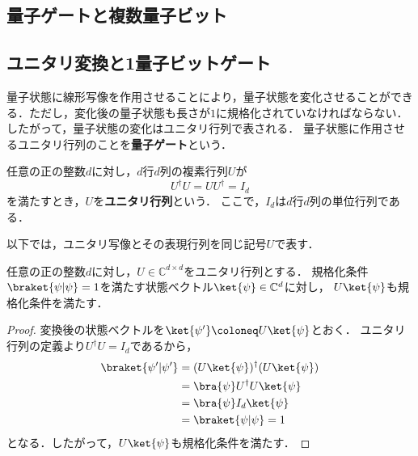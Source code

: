 \begin{samepage}
\section{量子ゲートと複数量子ビット}
\label{sec:gates-composite}

\subsection{ユニタリ変換と1量子ビットゲート}

量子状態に線形写像を作用させることにより，量子状態を変化させることができる．ただし，変化後の量子状態も長さが$1$に規格化されていなければならない．したがって，量子状態の変化はユニタリ行列で表される．
量子状態に作用させるユニタリ行列のことを\textbf{量子ゲート}という．

\begin{defi}[ユニタリ行列]
任意の正の整数$d$に対し，$d$行$d$列の複素行列$U$が
\label{def:unitary-matrix-map}
\begin{equation*}
  U^\dagger U=UU^\dagger=I_d
\end{equation*}
を満たすとき，$U$を\textbf{ユニタリ行列}という．
ここで，$I_d$は$d$行$d$列の単位行列である．
\end{defi}
\end{samepage}

以下では，ユニタリ写像とその表現行列を同じ記号$U$で表す．

\begin{prop}[ユニタリ行列による規格化条件の保存]
  任意の正の整数$d$に対し，$U\in\mathbb C^{d\times d}$をユニタリ行列とする．
  規格化条件$\braket{\psi|\psi}=1$を満たす状態ベクトル$\ket{\psi}\in\mathbb C^d$に対し，
  $U\ket{\psi}$も規格化条件を満たす．
  \label{prop:unitary-preserves-normalization}
\end{prop}
\begin{proof}
  変換後の状態ベクトルを$\ket{\psi'}\coloneq U\ket{\psi}$とおく．
  ユニタリ行列の定義より$U^\dagger U=I_d$であるから，
  \begin{equation*}
    \begin{aligned}
      \braket{\psi'|\psi'}
      &=(U\ket{\psi})^\dagger(U\ket{\psi}) \\
      &=\bra{\psi}U^\dagger U\ket{\psi} \\
      &=\bra{\psi}I_d\ket{\psi} \\
      &=\braket{\psi|\psi}=1
    \end{aligned}
  \end{equation*}
  となる．したがって，$U\ket{\psi}$も規格化条件を満たす．
\end{proof}

